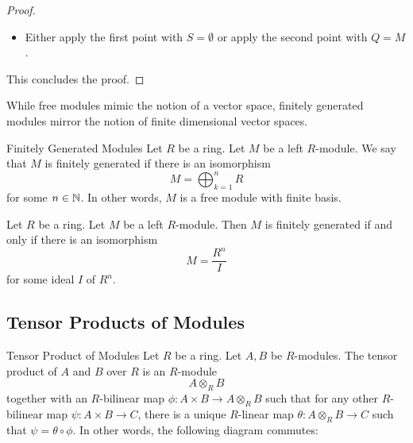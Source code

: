 \documentclass[a4paper]{article}
\begin{document}
\begin{thm}{}{}
\begin{proof}
\begin{itemize}
Suppose that this is false. Then there exists $q\in Q$ such that $q$ is not a linear combination of $Z$. By a similar argument as above, $Z\cup\{q\}$ is a bigger element of $\mP$, contradicting the fact that $Z$ is maximal. Thus we are done. 

\item Either apply the first point with $S=\emptyset$ or apply the second point with $Q=M$. 
\end{itemize}
This concludes the proof. 
\end{proof}
\end{thm}

While free modules mimic the notion of a vector space, finitely generated modules mirror the notion of finite dimensional vector spaces. 

\begin{defn}{Finitely Generated Modules}{} Let $R$ be a ring. Let $M$ be a left $R$-module. We say that $M$ is finitely generated if there is an isomorphism $$M=\bigoplus_{k=1}^nR$$ for some $n\in\mathbb{N}$. In other words, $M$ is a free module with finite basis. 
\end{defn}

\begin{prp}{}{} Let $R$ be a ring. Let $M$ be a left $R$-module. Then $M$ is finitely generated if and only if there is an isomorphism $$M=\frac{R^n}{I}$$ for some ideal $I$ of $R^n$. 
\end{prp}

\subsection{Tensor Products of Modules}
\begin{defn}{Tensor Product of Modules}{} Let $R$ be a ring. Let $A,B$ be $R$-modules. The tensor product of $A$ and $B$ over $R$ is an $R$-module $$A\otimes_R B$$ together with an $R$-bilinear map $\phi:A\times B\to A\otimes_RB$ such that for any other $R$-bilinear map $\psi:A\times B\to C$, there is a unique $R$-linear map $\theta:A\otimes_RB\to C$ such that $\psi=\theta\circ\phi$. In other words, the following diagram commutes: \\~\\
\end{defn}
\end{document}
